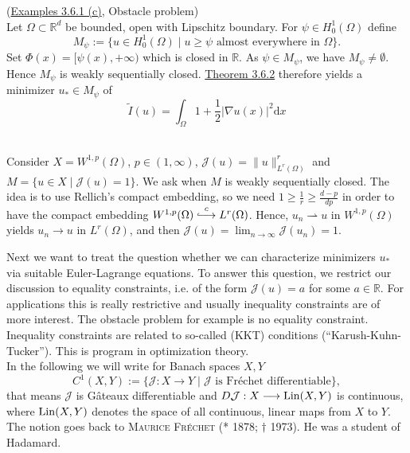 \begin{corollary}
(\hyperlink{examples_3_6_1}{Examples 3.6.1 (c)}, Obstacle problem)\\
Let $\Omega\subset\mathbb{R}^d$ be bounded, open with Lipschitz boundary. For $\psi\in H_0^1(\Omega)$ define
\[M_\psi:=\{u\in H_0^1(\Omega)\mid u\geq\psi\text{ almost everywhere in }\Omega\}.\]
Set $\Phi(x)=[\psi(x),+\infty)$ which is closed in $\mathbb{R}$. As $\psi\in M_\psi$, we have $M_\psi\ne\emptyset$.\\

Hence $M_\psi$ is weakly sequentially closed. \hyperlink{theorem_3_6_2}{Theorem 3.6.2} therefore yields a minimizer $u_*\in M_\psi$ of
\[\widetilde{I}(u)=\int_\Omega{1+\frac{1}{2}\lvert\nabla u(x)\rvert^2\mathrm{d}x}\]\\[11pt]
\end{corollary}

\begin{example}
Consider $X=W^{1,p}(\Omega)$, $p\in(1,\infty)$, $\mathcal{J}(u)=\lVert u\rVert_{L^r(\Omega)}^r$ and $M=\{u\in X\mid\mathcal{J}(u)=1\}$. We ask when $M$ is weakly sequentially closed. The idea is to use Rellich's compact embedding, so we need $1\geq\frac{1}{r}\geq\frac{d-p}{dp}$ in order to have the compact embedding $W^{1,p}(\Omega)\clonghookrightarrow L^r(\Omega)$. Hence, $u_n\rightharpoonup u$ in $W^{1,p}(\Omega)$ yields $u_n\to u$ in $L^r(\Omega)$, and then $\mathcal{J}(u)=\lim_{n\to\infty}{\mathcal{J}(u_n)}=1$.
\end{example}

Next we want to treat the question whether we can characterize minimizers $u_*$ via suitable Euler-Lagrange equations. To answer this question, we restrict our discussion to equality constraints, i.e. of the form $\mathcal{J}(u)=a$ for some $a\in\mathbb{R}$. For applications this is really restrictive and usually inequality constraints are of more interest. The obstacle problem for example is no equality constraint. Inequality constraints are related to so-called (KKT) conditions (``Karush-Kuhn-Tucker''). This is program in optimization theory.\\

In the following we will write for Banach spaces $X,Y$
\[C^1(X,Y):=\{\mathcal{J}:X\longrightarrow Y\mid\mathcal{J}\text{ is Fr\'echet differentiable}\},\]
that means $\mathcal{J}$ is G\^ateaux differentiable and $D\mathcal{J}:X\longrightarrow\operatorname{Lin}\mathopen{}\left(X,Y\right)\mathclose{}$ is continuous, where $\operatorname{Lin}\mathopen{}\left(X,Y\right)\mathclose{}$ denotes the space of all continuous, linear maps from $X$ to $Y$. The notion goes back to \textsc{Maurice Fr\'echet} (* 1878; $\dagger$ 1973). He was a student of Hadamard.\\


